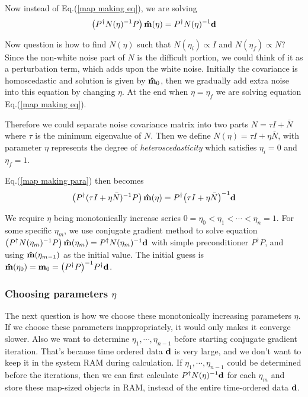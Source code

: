 \documentclass[11pt, letterpaper]{article}
\newcommand{\vbd}{\vb{d}}
\newcommand{\vbm}{\vb{m}}
\newcommand{\inv}[1]{#1^{-1}}
\newcommand{\hatm}{\vb{\hat{m}}}
\newcommand{\Pdagger}{P^{\dagger}}
\newcommand{\Nbar}{\bar{N}}
\newcommand{\PPinv}[1]{\inv{\qty(\Pdagger #1 P)}}
\begin{document}
Now instead of Eq.(\ref{map making eq}), we are solving
\begin{align}
\qty(\Pdagger \inv{N(\eta)} P)\, \hatm(\eta) 
= \Pdagger \inv{N(\eta)} \vbd \label{map making para}
\end{align}

Now question is how to find $N(\eta)$ such that $N(\eta_i) \propto I$
and $N (\eta_f) \propto N$?
Since the non-white noise part of $N$ is the difficult portion,
we could think of it as a perturbation term, which adds upon the white noise.
Initially the covariance is homoscedastic and solution is given by $\hatm_0$,
then we gradually add extra noise into this equation by changing $\eta$.
At the end when $\eta=\eta_f$ we are solving equation Eq.(\ref{map making eq}).

Therefore we could separate noise covariance matrix into two parts
$N = \tau I + \Nbar$ where $\tau$ is the minimum eigenvalue of $N$. 
Then we define $N(\eta) = \tau I + \eta \Nbar$, 
with parameter $\eta$ represents the degree of \textit{heteroscedasticity} which satisfies $\eta_i = 0$ and $\eta_f=1$.

Eq.(\ref{map making para}) then becomes
\begin{align}
\qty(\Pdagger \inv{(\tau I + \eta \Nbar)}P) \, \hatm(\eta) 
= \Pdagger \inv{\qty(\tau I + \eta \Nbar)} \vbd  
\end{align}

We require $\eta$ being monotonically increase
series $0 = \eta_0 < \eta_1 < \cdots < \eta_n = 1$.
For some specific $\eta_m$, we use conjugate gradient method to solve equation 
$\qty(\Pdagger \inv{N(\eta_m)} P)\, 
\hatm(\eta_m) = \Pdagger \inv{N(\eta_m)} \vbd$
with simple preconditioner $\Pdagger P$,
and using $\hatm(\eta_{m-1})$ as the initial value.
The initial guess is $\hatm(\eta_0) = \vbm_0 = \PPinv{} \Pdagger \vbd$.


\subsubsection{Choosing parameters $\eta$}
The next question is how we choose these monotonically increasing parameters
$\eta$. 
If we choose these parameters inappropriately, it would only makes it converge
slower.
Also we want to determine $\eta_1, \cdots, \eta_{n-1}$ before starting conjugate
gradient iteration.
That's because time ordered data $\vbd$ is very large,
and we don't want to keep it in the system RAM during calculation.
If $\eta_1, \cdots, \eta_{n-1}$ could be determined before the iterations, 
then we can first calculate $\Pdagger \inv{N(\eta)} \vbd$ for each $\eta_m$
and store these map-sized objects in RAM,
instead of the entire time-ordered data $\vbd$.
\end{document}
